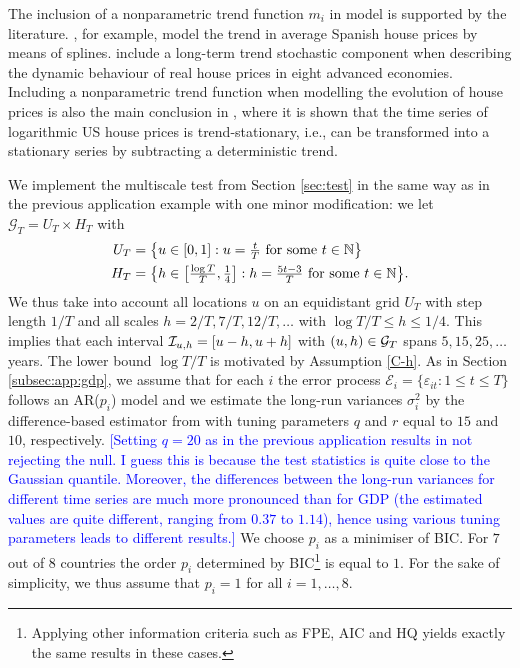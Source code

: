 \documentclass[a4paper,12pt]{article}
\makeatletter
\renewcommand{\eqref}[1]{\tagform@{\ref{#1}}}
\makeatother
\begin{document}
The inclusion of a nonparametric trend function $m_i$ in model \eqref{eq:model:app4} is supported by the literature. \cite{Ugarte2009}, for example, model the trend in average Spanish house prices by means of splines. \cite{Winter2022} include a long-term trend stochastic component when describing the dynamic behaviour of real house prices in eight advanced economies. Including a nonparametric trend function when modelling the evolution of house prices is also the main conclusion in \cite{Zhang2016}, where it is shown that the time series of logarithmic US house prices is trend-stationary, i.e., can be transformed into a stationary series by subtracting a deterministic trend.


We implement the multiscale test from Section \ref{sec:test} in the same way as in the previous application example with one minor modification: we let $\mathcal{G}_T = U_T \times H_T$ with 
\begin{align*}
U_T & = \big\{ u \in [0,1]: u = \textstyle{\frac{t}{T}} \text{ for some } t \in \mathbb{N} \big\} \\
H_T & = \big\{ h \in \big[ \textstyle{\frac{\log T}{T}}, \textstyle{\frac{1}{4}} \big]:  h = \textstyle{\frac{5t - 3}{T}} \text{ for some } t \in \mathbb{N} \big\}. 
\end{align*}
We thus take into account all locations $u$ on an equidistant grid $U_T$ with step length $1/T$ and all scales $h=2/T, 7/T, 12/T,\ldots$ with $\log T /T \le h \le 1/4$. This implies that each interval $\mathcal{I}_{u, h} =[u-h,u+h]$ with $(u,h) \in \mathcal{G}_T$ spans $5, 15, 25, \ldots$ years. The lower bound $\log T / T$ is motivated by Assumption \ref{C-h}. As in Section \ref{subsec:app:gdp}, we assume that for each $i$ the error process $\mathcal{E}_i = \{\varepsilon_{it}: 1 \leq t \leq T\}$ follows an AR($p_i$) model and we estimate the long-run variances $\sigma_i^2$ by the difference-based estimator from \cite{KhismatullinaVogt2020} with tuning parameters $q$ and $r$ equal to $15$ and $10$, respectively. \textcolor{blue}{[Setting $q = 20$ as in the previous application results in not rejecting the null. I guess this is because the test statistics is quite close to the Gaussian quantile. Moreover, the differences between the long-run variances for different time series are much more pronounced than for GDP (the estimated values are quite different, ranging from $0.37$ to $1.14$), hence using various tuning parameters leads to different results.]} We choose $p_i$ as a minimiser of BIC. For $7$ out of $8$ countries the order $p_i$ determined by BIC\footnote{Applying other information criteria such as FPE, AIC and HQ yields exactly the same results in these cases.} is equal to $1$. For the sake of simplicity, we thus assume that $p_i = 1$ for all $i =1,\ldots, 8$.
\end{document}
